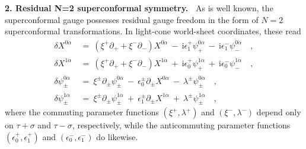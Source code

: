 \documentclass[a4paper,11pt]{article}
\def\de{\delta}
\def\eps{\epsilon}
\def\l{\lambda}
\def\s{\sigma}
\def\t{\tau}
\def\x{\xi}
\def\j{\psi}
\def\i{\textrm{i}}
\def\N2{$N{=}2$}
\def\pa{\mbox{$\partial$}}
\def\ad{{\dot{\alpha}}}
\def\zdd{{\ddot{0}}}
\def\odd{{\ddot{1}}}
\begin{document}
\bigskip\noindent
{\bf 2. Residual N=2 superconformal symmetry.\ }
As is well known, the superconformal gauge possesses residual
gauge freedom in the form of \N2 superconformal transformations.
In light-cone world-sheet coordinates, these read
\begin{align}
\de X^{0\ad}\ &=\ (\x^+\pa_++\x^-\pa_-) X^{0\ad}\
-\ \i\eps_1^+\j_+^{\zdd\ad}\ -\ \i\eps_1^-\j_-^{\zdd\ad} \quad , \\
\de X^{1\ad}\ &=\ (\x^+\pa_++\x^-\pa_-) X^{1\ad}\
+\ \i\eps_0^+\j_+^{\odd\ad}\ +\ \i\eps_0^-\j_-^{\odd\ad} \quad , \\
\de\j_\pm^{\zdd\ad}\ &=\ \x^\pm \pa_\pm \j_\pm^{\zdd\ad}\
-\ \eps_0^\pm\pa_\pm X^{0\ad}\ -\ \l^\pm\j_\pm^{\zdd\ad} \quad , \\
\de\j_\pm^{\odd\ad}\ &=\ \x^\pm \pa_\pm \j_\pm^{\odd\ad}\
+\ \eps_1^\pm\pa_\pm X^{1\ad}\ +\ \l^\pm\j_\pm^{\odd\ad} \quad ,
\end{align}
where the commuting parameter functions $(\x^+,\l^+)$ and $(\x^-,\l^-)$
depend only on $\t{+}\s$ and $\t{-}\s$, respectively, while the anticommuting
parameter functions $(\eps^+_0,\eps^+_1)$ and $(\eps^-_0,\eps^-_1)$
do likewise.
\end{document}
